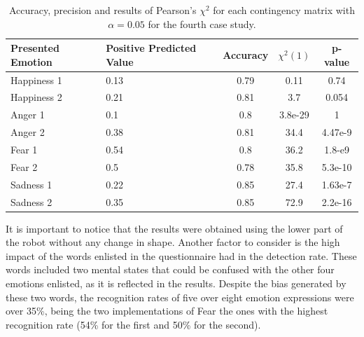 \begin{table}
\centering
\small
\caption{Accuracy, precision and results of Pearson's $\chi^2$ for each contingency matrix with $\alpha = 0.05$ for the fourth case study.} 
\label{table:Precision2}
		\begin{tabular}{|p{3 cm}|p{2 cm}|c|c|c|}
		\hline
		\textbf{Presented Emotion} & \textbf{Positive Predicted Value} & \textbf{Accuracy} & \textbf{$\chi^2(1)$} & \textbf{p-value}\\
		\hline
		Happiness 1 & 0.13 & 0.79 & 0.11 & 0.74\\
		\hline
		Happiness 2 & 0.21 & 0.81& 3.7 &0.054\\
		\hline
		Anger 1 & 0.1 & 0.8 & 3.8e-29 & 1\\
		\hline
		Anger 2 & 0.38 & 0.81 & 34.4 & 4.47e-9\\
		\hline
		Fear 1 & 0.54 & 0.8 & 36.2 & 1.8-e9\\
		\hline 
		Fear 2 & 0.5 & 0.78 & 35.8 & 5.3e-10\\
		\hline
		Sadness 1 & 0.22 & 0.85 & 27.4 & 1.63e-7\\
		\hline
		Sadness 2 & 0.35 & 0.85 & 72.9 & 2.2e-16\\		 
		\hline
			\end{tabular}
\end{table} 
It is important to notice that the results were obtained using the lower part of the robot without any change in shape. Another factor to consider is the high impact of the words enlisted in the questionnaire had in the detection rate. These words included two mental states that could be confused with the other four emotions enlisted, as it is reflected in the results. Despite the bias generated by these two words, the recognition rates of five over eight emotion expressions were over 35\%, being the two implementations of Fear the ones with the highest recognition rate (54\% for the first and 50\% for the second).